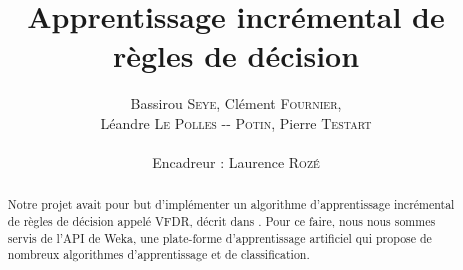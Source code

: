 \documentclass[a4paper,11pt]{article}
\title{ \textbf{Apprentissage incrémental de règles de décision} }
\author{Bassirou \textsc{Seye}, Clément \textsc{Fournier}, \\
        Léandre \textsc{Le Polles -{}- Potin}, Pierre \textsc{Testart} \\
        \\
        Encadreur : Laurence \textsc{Rozé}}
\date{}
\begin{document}
          

    \maketitle                 
    \thispagestyle{empty}      

    \begin{abstract}

        Notre projet avait pour but d'implémenter un algorithme d'apprentissage incrémental de règles de décision appelé VFDR, décrit dans \cite{Gama-VFDR}. Pour ce faire, nous nous sommes servis de l’API de Weka, une plate-forme d'apprentissage artificiel qui propose de nombreux algorithmes d'apprentissage et de classification. 
        
    \end{abstract} 

    
    
    
    

    \nocite{*}
    
\end{document}

